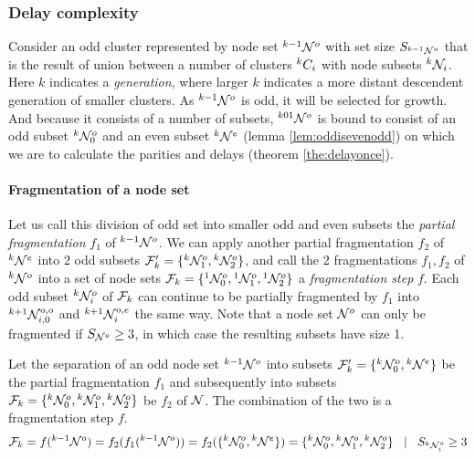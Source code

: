 \subsubsection{Delay complexity}

Consider an odd cluster represented by node set ${}^{k-1}\mathcal{N}^o$ with set size $S_{{}^{k-1}\mathcal{N}^o}$ that is the result of union between a number of clusters ${}^{k}C_i$ with node subsets ${}^{k}\mathcal{N}_i$. Here $k$ indicates a \emph{generation}, where larger $k$ indicates a more distant descendent generation of smaller clusters. As ${}^{k-1}\mathcal{N}^o$ is odd, it will be selected for growth. And because it consists of a number of subsets, ${}^{k01}\mathcal{N}^o$ is bound to consist of an odd subset ${}^{k}\mathcal{N}^o_0$ and an even subset ${}^{k}\mathcal{N}^e$ (lemma \ref{lem:oddisevenodd}) on which we are to calculate the parities and delays (theorem \ref{the:delayonce}).

\paragraph{Fragmentation of a node set}

Let us call this division of odd set into smaller odd and even subsets the \emph{partial fragmentation} $f_1$ of ${}^{k-1}\mathcal{N}^o$. We can apply another partial fragmentation $f_2$ of ${}^{k}\mathcal{N}^e$ into 2 odd subsets $\mathcal{F}'_k=\{{}^{k}\mathcal{N}^{o}_1, {}^{k}\mathcal{N}^{o}_2\}$, and call the 2 fragmentations $f_1, f_2$ of ${}^{k}\mathcal{N}^o$ into a set of node sets $\mathcal{F}_k = \{{}^{1}\mathcal{N}^o_0, {}^{1}\mathcal{N}^{o}_1, {}^{1}\mathcal{N}^{o}_2\}$ a \emph{fragmentation step} $f$. Each odd subset ${}^{k}\mathcal{N}^o_i$ of $\mathcal{F}_k$ can continue to be partially fragmented by $f_1$ into ${}^{k+1}\mathcal{N}^{o,o}_{i, 0}$ and ${}^{k+1}\mathcal{N}^{o,e}_i$ the same way. Note that a node set $\mathcal{N}^o$ can only be fragmented if $S_{\mathcal{N}^o} \geq 3$, in which case the resulting subsets have size 1.

\begin{lemma}\label{lem:partialfrag}
  Let the separation of an odd node set ${}^{k-1}\mathcal{N}^o$ into subsets $\mathcal{F}_k'=\{{}^{k}\mathcal{N}^o_0, {}^{k}\mathcal{N}^e\}$ be the partial fragmentation $f_1$ and subsequently into subsets $\mathcal{F}_k= \{{}^{k}\mathcal{N}^o_0, {}^{k}\mathcal{N}^{o}_1, {}^{k}\mathcal{N}^{o}_2\}$ be $f_2$ of $\mathcal{N}$. The combination of the two is a fragmentation step $f$.
  \begin{equation}\label{eq:partialfrag}
    \mathcal{F}_k = f({}^{k-1}\mathcal{N}^o) = f_2(f_1({}^{k-1}\mathcal{N}^o)) = f_2(\{{}^{k}\mathcal{N}^o_0, {}^{k}\mathcal{N}^e\}) = \{{}^{k}\mathcal{N}^o_0, {}^{k}\mathcal{N}^{o}_1, {}^{k}\mathcal{N}^{o}_2\} \hspace{.3cm} | \hspace{.3cm} S_{{}^{k}\mathcal{N}^o_i} \geq 3
  \end{equation}
\end{lemma}

